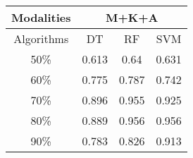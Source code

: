 \begin{table}[h]
\begin{tabular}{|c|c|c|c|}
\hline
Modalities & \multicolumn{3}{c|}{M+K+A} \\ \hline
Algorithms & DT      & RF      & SVM    \\ \hline
50\%       & 0.613   & 0.64    & 0.631  \\ \hline
60\%       & 0.775   & 0.787   & 0.742  \\ \hline
70\%       & 0.896   & 0.955   & 0.925  \\ \hline
80\%       & 0.889   & 0.956   & 0.956  \\ \hline
90\%       & 0.783   & 0.826   & 0.913  \\ \hline
\end{tabular}
\end{table}